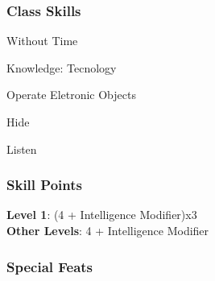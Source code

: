 \documentclass[ letterpaper,12pt]{article}
\begin{document}
\subsubsection{Class Skills}
\begin{itemize}
{\it
\item{Without Time}
\item{Knowledge: Tecnology}
\item{Operate Eletronic Objects}
\item{Hide}
\item{Listen}
}
\end{itemize}

\subsubsection{Skill Points}
{\bf Level 1}: (4 + Intelligence Modifier)x3\\
{\bf Other Levels}: 4 + Intelligence Modifier\\

\subsubsection{Special Feats}
\end{document}
